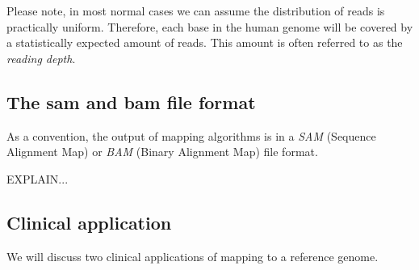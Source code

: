 Please note, in most normal cases we can assume the distribution of reads is practically uniform. Therefore, each base in the human genome will be covered by a statistically expected amount of reads. This amount is often referred to as the \emph{reading depth}.


\subsection{The sam and bam file format}

As a convention, the output of mapping algorithms is in a \emph{SAM} (Sequence Alignment Map) or \emph{BAM} (Binary Alignment Map) file format. 

EXPLAIN...

\subsection{Clinical application}

We will discuss two clinical applications of mapping to a reference genome.

